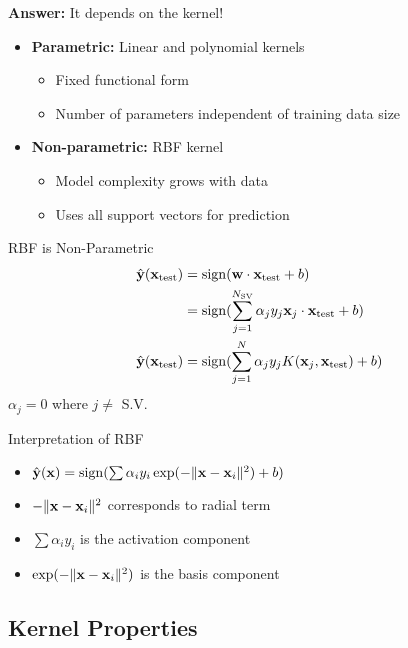 \documentclass{beamer}
\begin{document}
	\begin{frame}\textbf{Answer:} It depends on the kernel!
	    
	    \begin{itemize}
\item \textbf{Parametric:} Linear and polynomial kernels
	    		\begin{itemize}
	    			\item Fixed functional form
	    			\pause
\item Number of parameters independent of training data size
	    		\end{itemize}
	    	\item \textbf{Non-parametric:} RBF kernel
	    		\begin{itemize}
\item Model complexity grows with data
	    			\item Uses all support vectors for prediction
	    		\end{itemize}
	    \end{itemize}
	\end{frame}
	\begin{frame}{RBF is Non-Parametric}
	    \begin{align*}
	        \hat{\mathbf{y}}(\mathbf{x}_{\text{test}}) &= \operatorname{sign}(\mathbf{w} \cdot \mathbf{x}_{\text{test}} + b) \\
	        &= \operatorname{sign}(\sum_{j=1}^{N_{\text{SV}}}\alpha_{j}y_{j}\mathbf{x}_{j} \cdot \mathbf{x}_{\text{test}} + b)\\
	        \hat{\mathbf{y}}(\mathbf{x}_{\text{test}}) &= \operatorname{sign}(\sum_{j=1}^{N}\alpha_{j}y_{j} K(\mathbf{x}_{j}, \mathbf{x}_{\text{test}}) + b)
	    \end{align*}
	    $\alpha_{j} = 0$ where $j \neq$ S.V.
	\end{frame}

	\begin{frame}{Interpretation of RBF}
		\begin{itemize}
\item $\hat{\mathbf{y}}(\mathbf{x}) = \operatorname{sign}(\sum \alpha_{i}y_{i}\exp(-\|\mathbf{x} - \mathbf{x}_{i}\|^{2}) + b)$
			\item $-\|\mathbf{x} - \mathbf{x}_{i}\|^{2}$ corresponds to radial term
			\pause
\item $\sum \alpha_{i}y_{i}$ is the activation component
			\item $\exp(-\|\mathbf{x} - \mathbf{x}_{i}\|^{2})$ is the basis component
		\end{itemize}

	\end{frame}

\subsection{Kernel Properties}
\end{document}
